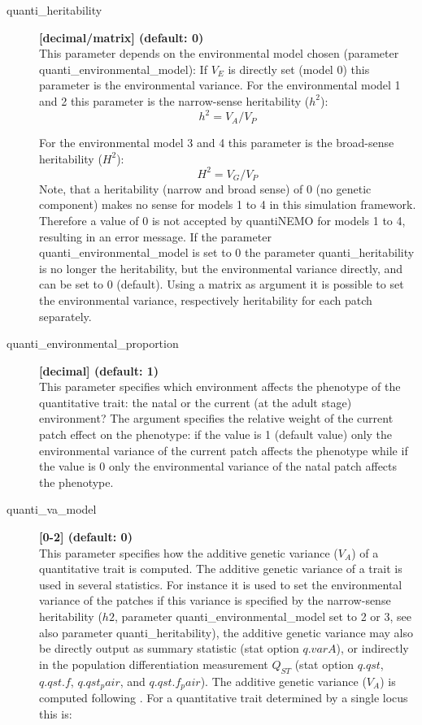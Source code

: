 \documentclass[letterpaper,12pt,oneside]{book}
\begin{document}
\begin{description}
\item[quanti\_heritability] \textbf{[decimal/matrix] (default: 0)}\\
This parameter depends on the environmental model chosen (parameter \linebreak\textsf{quanti\_environmental\_model}): If $V_{E}$ is directly set (model 0) this parameter is the environmental variance. For the environmental model 1 and 2 this parameter is the narrow-sense heritability ($h^{2}$):
	\[h^{2} = V_{A}/V_{P}\]
	
For the environmental model 3 and 4 this parameter is the broad-sense heritability ($H^{2}$):
	\[H^{2} = V_{G}/V_{P}\]
Note, that a heritability (narrow and broad sense) of 0 (no genetic component) makes no sense for models 1 to 4 in this simulation framework. Therefore a value of 0 is not accepted by quantiNEMO for models 1 to 4, resulting in an error message. If the parameter \textsf{quanti\_environmental\_model} is set to 0 the parameter \textsf{quanti\_heritability} is no longer the heritability, but the environmental variance directly, and can be set to 0 (default). Using a matrix as argument it is possible to set the environmental variance, respectively heritability for each patch separately.

\item [quanti\_environmental\_proportion] \textbf{[decimal] (default: 1)}\\
This parameter specifies which environment affects the phenotype of the quantitative trait: the natal or the current (at the adult stage) environment? The argument specifies the relative weight of the current patch effect on the phenotype: if the value is 1 (default value) only the environmental variance of the current patch affects the phenotype while if the value is 0 only the environmental variance of the natal patch affects the phenotype.

\item [quanti\_va\_model] \textbf{[0-2] (default: 0)}\\
This parameter specifies how the additive genetic variance ($V_{A}$) of a quantitative trait is computed. The additive genetic variance of a trait is used in several statistics. For instance it is used to set the environmental variance of the patches if this variance is specified by the narrow-sense heritability ($h2$, parameter \textsf{quanti\_environmental\_model} set to 2 or 3, see also parameter \textsf{quanti\_heritability}), the additive genetic variance may also be directly output as summary statistic (stat option $q.varA$), or indirectly in the population differentiation measurement $Q_{ST}$ (stat option $q.qst$, $q.qst.f$, $q.qst_pair$, and $q.qst.f_pair$).
The additive genetic variance ($V_{A}$) is computed following \citet[p85-87]{Lynch_1998}. For a quantitative trait determined by a single locus this is:


\end{description}
\end{document}
